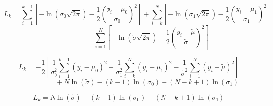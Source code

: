 \documentclass[11pt]{article}
\begin{document}
\[L_k=
\sum_{i=1}^{k-1}\left[-\ln(\sigma_0\sqrt{2\pi})-\frac 12\left(\frac{y_i-\mu_0}{\sigma_0}\right)^2\right]
+\sum_{i=k}^N\left[-\ln(\sigma_1\sqrt{2\pi})-\frac 12\left(\frac{y_i-\mu_1}{\sigma_1}\right)^2\right]\]
\[~~~~~~~~~~~~~~~~~~~~~~~~-\sum_{i=1}^N\left[-\ln(\tilde\sigma\sqrt{2\pi})-\frac 12\left(\frac{y_i-\tilde\mu}{\tilde\sigma}\right)^2\right]\]

\[L_k=
-\frac 12\left[\frac 1{\sigma_0^2}\sum_{i=1}^{k-1}(y_i-\mu_0)^2
+\frac 1{\sigma_1^2}\sum_{i=k}^N(y_i-\mu_1)^2
-\frac 1{\tilde\sigma^2}\sum_{i=1}^N(y_i-\tilde\mu)^2\right]\]
\[~~~~~~~~~~~~~~~~~~~~~~~~+N\ln(\tilde\sigma)-(k-1)\ln(\sigma_0)-(N-k+1)\ln(\sigma_1)\]

\[L_k=N\ln(\tilde\sigma)-(k-1)\ln(\sigma_0)-(N-k+1)\ln(\sigma_1)\]
\end{document}
